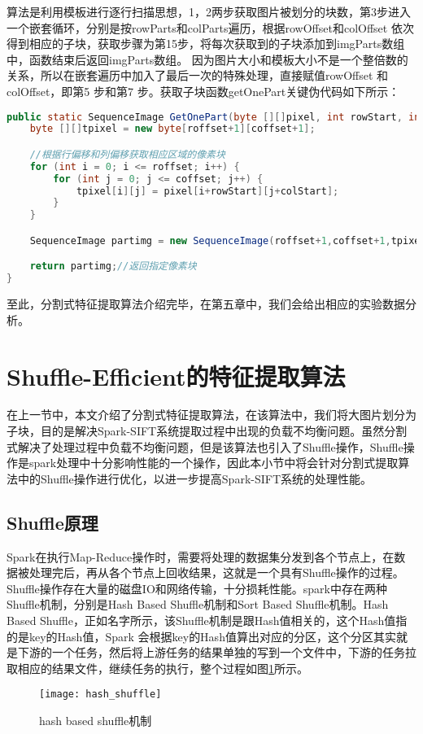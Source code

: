 算法是利用模板进行逐行扫描思想，1，2两步获取图片被划分的块数，第3步进入一个嵌套循环，分别是按rowParts和colParts遍历，根据rowOffset和colOffset 依次得到相应的子块，获取步骤为第15步，将每次获取到的子块添加到imgParts数组中，函数结束后返回imgParts数组。 因为图片大小和模板大小不是一个整倍数的关系，所以在嵌套遍历中加入了最后一次的特殊处理，直接赋值rowOffset 和colOffset，即第5 步和第7 步。获取子块函数getOnePart关键伪代码如下所示：
\begin{lstlisting}[language=Java]
public static SequenceImage GetOnePart(byte [][]pixel, int rowStart, int colStart, int roffset, int coffset){
    byte [][]tpixel = new byte[roffset+1][coffset+1];

    //根据行偏移和列偏移获取相应区域的像素块
    for (int i = 0; i <= roffset; i++) {
        for (int j = 0; j <= coffset; j++) {
            tpixel[i][j] = pixel[i+rowStart][j+colStart];
        }
    }

    SequenceImage partimg = new SequenceImage(roffset+1,coffset+1,tpixel);

    return partimg;//返回指定像素块
}
\end{lstlisting}

至此，分割式特征提取算法介绍完毕，在第五章中，我们会给出相应的实验数据分析。
\section{Shuffle-Efficient的特征提取算法}
在上一节中，本文介绍了分割式特征提取算法，在该算法中，我们将大图片划分为子块，目的是解决Spark-SIFT系统提取过程中出现的负载不均衡问题。虽然分割式解决了处理过程中负载不均衡问题，但是该算法也引入了Shuffle操作，Shuffle操作是spark处理中十分影响性能的一个操作，因此本小节中将会针对分割式提取算法中的Shuffle操作进行优化，以进一步提高Spark-SIFT系统的处理性能。
\subsection{Shuffle原理}
Spark在执行Map-Reduce操作时，需要将处理的数据集分发到各个节点上，在数据被处理完后，再从各个节点上回收结果，这就是一个具有Shuffle操作的过程。Shuffle操作存在大量的磁盘IO和网络传输，十分损耗性能。spark中存在两种Shuffle机制，分别是Hash Based Shuffle机制和Sort Based Shuffle机制。Hash Based Shuffle，正如名字所示，该Shuffle机制是跟Hash值相关的，这个Hash值指的是key的Hash值，Spark 会根据key的Hash值算出对应的分区，这个分区其实就是下游的一个任务，然后将上游任务的结果单独的写到一个文件中，下游的任务拉取相应的结果文件，继续任务的执行，整个过程如图\ref{fig:hash_shuffle}所示。
\begin{figure}[htp]
\centering
\texttt{[image: hash\_shuffle]}
\caption{hash based shuffle机制}
\label{fig:hash_shuffle}
\end{figure}


